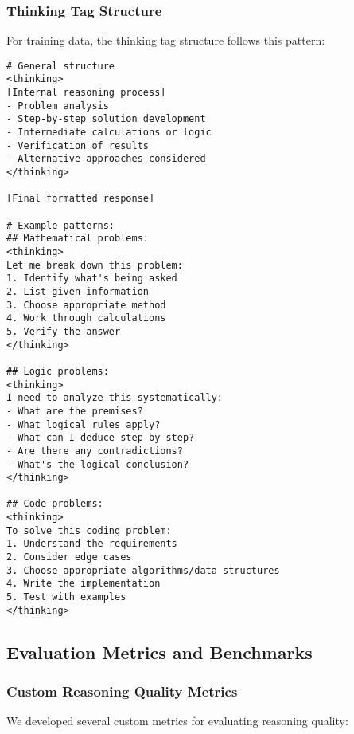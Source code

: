 \subsubsection{Thinking Tag Structure}

For \supra{} training data, the thinking tag structure follows this pattern:

\begin{lstlisting}[caption=Thinking tag structure specification,label=lst:thinking-structure]
# General structure
<thinking>
[Internal reasoning process]
- Problem analysis
- Step-by-step solution development  
- Intermediate calculations or logic
- Verification of results
- Alternative approaches considered
</thinking>

[Final formatted response]

# Example patterns:
## Mathematical problems:
<thinking>
Let me break down this problem:
1. Identify what's being asked
2. List given information
3. Choose appropriate method
4. Work through calculations
5. Verify the answer
</thinking>

## Logic problems:
<thinking>
I need to analyze this systematically:
- What are the premises?
- What logical rules apply?
- What can I deduce step by step?
- Are there any contradictions?
- What's the logical conclusion?
</thinking>

## Code problems:
<thinking>
To solve this coding problem:
1. Understand the requirements
2. Consider edge cases
3. Choose appropriate algorithms/data structures
4. Write the implementation
5. Test with examples
</thinking>
\end{lstlisting}

\subsection{Evaluation Metrics and Benchmarks}

\subsubsection{Custom Reasoning Quality Metrics}

We developed several custom metrics for evaluating reasoning quality:

